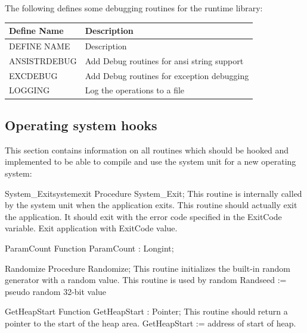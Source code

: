 \documentclass [a4paper,12pt]{article}
\begin{document}
The following defines some debugging routines for the runtime library:

\begin{longtable}{|l|p{10cm}|}
\hline
Define Name & Description \\
\hline
\endhead
\hline
\endfoot
DEFINE NAME     & Description \\
ANSISTRDEBUG    & Add Debug routines for ansi string support \\
EXCDEBUG        & Add Debug routines for exception debugging \\
LOGGING         & Log the operations to a file \\
\end{longtable}

\subsection{Operating system hooks}
\label{subsec:operating}

This section contains information on all routines which should be hooked and
implemented to be able to compile and use the system unit for a new
operating system:

\begin{functionl}{System{\_}Exit}{systemexit}
\Declaration
Procedure System{\_}Exit;
\Description
This routine is internally called by the system unit when the application
exits.
\Notes
This routine should actually exit the application. It should exit with the
error code specified in the \textsf{ExitCode} variable.
\Algorithm
Exit application with ExitCode value.
\end{functionl}

\begin{function}{ParamCount}
\Declaration
Function ParamCount : Longint;
\end{function}

\begin{procedure}{Randomize}
\Declaration
Procedure Randomize;
\Description
This routine initializes the built-in random generator with a random value.
\Notes
This routine is used by random
\Algorithm
Randseed := pseudo random 32-bit value
\end{procedure}

\begin{function}{GetHeapStart}
\Declaration
Function GetHeapStart : Pointer;
\Description
This routine should return a pointer to the start of the heap area.
\Notes
GetHeapStart := address of start of heap.
\end{function}
\end{document}
